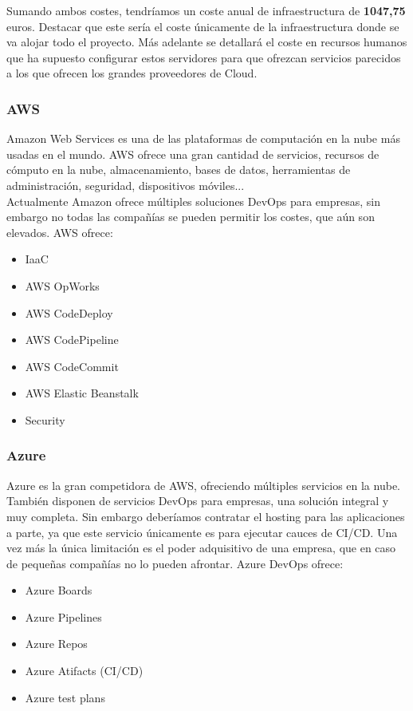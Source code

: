 \begin{text}
			Sumando ambos costes, tendríamos un coste anual de infraestructura de \textbf{1047,75} euros. Destacar que este sería el coste únicamente de la infraestructura donde se va alojar todo el proyecto. Más adelante se detallará el coste en recursos humanos que ha supuesto configurar estos servidores para que ofrezcan servicios parecidos a los que ofrecen los grandes proveedores de Cloud.
			
			\end{text}
		\subsubsection{AWS}
			\begin{text}
				Amazon Web Services es una de las plataformas de computación en la nube más usadas en el mundo. 
				AWS ofrece una gran cantidad de servicios, recursos de cómputo en la nube, almacenamiento, bases de datos, herramientas de administración, seguridad, dispositivos móviles... \\
				Actualmente Amazon ofrece múltiples soluciones DevOps para empresas, sin embargo no todas las compañías se pueden permitir los costes, que aún son elevados. AWS ofrece:
				
				\begin{itemize}
					\item IaaC
					\item AWS OpWorks
					\item AWS CodeDeploy	
					\item AWS CodePipeline
					\item AWS CodeCommit
					\item AWS Elastic Beanstalk
					\item Security
				\end{itemize}
				
			\end{text}
		
		\subsubsection{Azure}
			\begin{text}
				Azure es la gran competidora de AWS, ofreciendo múltiples servicios en la nube. También disponen de servicios DevOps \cite{AzureDev63:online} para empresas, una solución integral y muy completa. Sin embargo deberíamos contratar el hosting para las aplicaciones a parte, ya que este servicio únicamente es para ejecutar cauces de CI/CD. Una vez más la única limitación es el poder adquisitivo de una empresa, que en caso de pequeñas compañías no lo pueden afrontar. Azure DevOps ofrece:
				\begin{itemize}
					\item Azure Boards
					\item Azure Pipelines
					\item Azure Repos
					\item Azure Atifacts (CI/CD)
					\item Azure test plans
				\end{itemize}
			\end{text}
		
